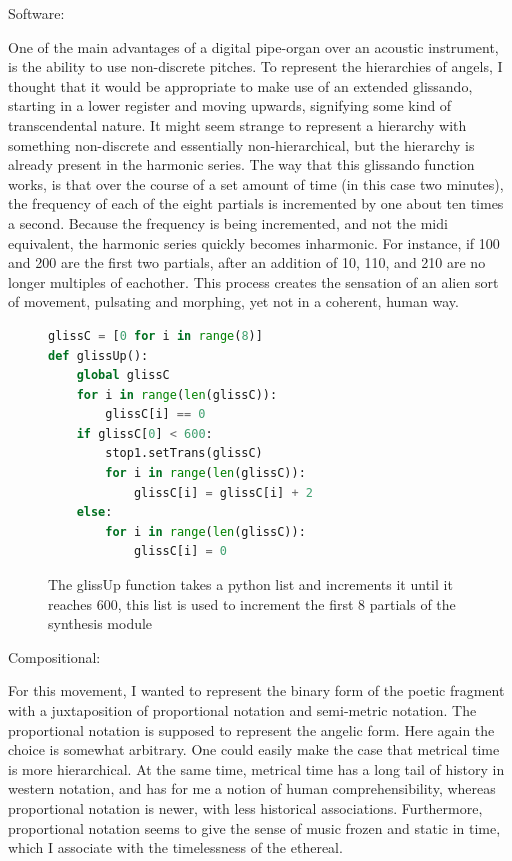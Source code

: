 \documentclass[12pt,twoside,maitrise]{dms_ks}
\theoremstyle{definition}
\begin{document}
Software:

One of the main advantages of a digital pipe-organ over an acoustic instrument, is the ability to use non-discrete pitches.
To represent the hierarchies of angels, I thought that it would be appropriate to make use of an extended glissando, starting in a lower register and moving upwards, signifying some kind of transcendental nature.
It might seem strange to represent a hierarchy with something non-discrete and essentially non-hierarchical, but the hierarchy is already present in the harmonic series.
The way that this glissando function works, is that over the course of a set amount of time (in this case two minutes), the frequency of each of the eight partials is incremented by one about ten times a second.
Because the frequency is being incremented, and not the midi equivalent, the harmonic series quickly becomes inharmonic.
For instance, if 100 and 200 are the first two partials, after an addition of 10, 110, and 210 are no longer multiples of eachother.
This process creates the sensation of an alien sort of movement, pulsating and morphing, yet not in a coherent, human way.    
\begin{figure}[H]
\begin{lstlisting}[language=Python]
glissC = [0 for i in range(8)]
def glissUp():
    global glissC
    for i in range(len(glissC)):
        glissC[i] == 0
    if glissC[0] < 600:
        stop1.setTrans(glissC)
        for i in range(len(glissC)):
            glissC[i] = glissC[i] + 2
    else:
        for i in range(len(glissC)):
            glissC[i] = 0
\end{lstlisting}
\caption{The glissUp function takes a python list and increments it until it reaches 600, this list is used to increment the first 8 partials of the synthesis module}
\end{figure}

Compositional:

For this movement, I wanted to represent the binary form of the poetic fragment with a juxtaposition of proportional notation and semi-metric notation.
The proportional notation is supposed to represent the angelic form.
Here again the choice is somewhat arbitrary.
One could easily make the case that metrical time is more hierarchical.
At the same time, metrical time has a long tail of history in western notation, and has for me a notion of human comprehensibility, whereas proportional notation is newer, with less historical associations.
Furthermore, proportional notation seems to give the sense of music frozen and static in time, which I associate with the timelessness of the ethereal.
\end{document}

